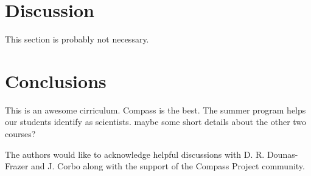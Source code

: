 \documentclass[aps,pre,10pt,superscriptaddress,showpacs,amsmath,amssymb,nofootinbib]{revtex4-1}
\begin{document}
\section{Discussion}
This section is probably not necessary.



\section{Conclusions}
This is an awesome cirriculum.  Compass is the best.  The summer program helps
our students identify as scientists.  maybe some short details about the other
two courses?


\acknowledgments The authors would like to acknowledge helpful discussions with
D. R. Dounas-Frazer and J. Corbo along with the support of the Compass Project
community.


\end{document}
